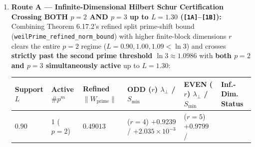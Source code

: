 \documentclass[
  11pt,
]{article}
\newcounter{none} %
\begin{document}
\begin{enumerate}
\def\labelenumi{\arabic{enumi}.}
\item
  \textbf{Route A --- Infinite-Dimensional Hilbert Schur Certification
  Crossing BOTH \(p = 2\) AND \(p = 3\) up to \(L = 1.30\)
  (\texttt{{[}1A{]}}--\texttt{{[}1B{]}}):} Combining Theorem 6.17.2's
  refined split prime-shift bound
  (\texttt{weilPrime\_refined\_norm\_bound}) with higher finite-block
  dimensions \(r\) clears the entire \(p = 2\) regime
  (\(L = 0.90, 1.00, 1.09 < \ln 3\)) and crosses \textbf{strictly past
  the second prime threshold \(\ln 3 \approx 1.0986\)} with \textbf{both
  \(p = 2\) and \(p = 3\) simultaneously active} up to \(L = 1.30\):

  {\def\LTcaptype{none} %
  \begin{longtable}[]{@{}
    >{\centering\arraybackslash}p{}
    >{\centering\arraybackslash}p{}
    >{\centering\arraybackslash}p{}
    >{\centering\arraybackslash}p{}
    >{\centering\arraybackslash}p{}
    >{\raggedright\arraybackslash}p{}@{}}
  \toprule\noalign{}
  \begin{minipage}[b]{\linewidth}\centering
  Support \(L\)
  \end{minipage} & \begin{minipage}[b]{\linewidth}\centering
  Active \(\#p^m\)
  \end{minipage} & \begin{minipage}[b]{\linewidth}\centering
  Refined \(\|W_{\text{prime}}\|\)
  \end{minipage} & \begin{minipage}[b]{\linewidth}\centering
  ODD (\(r\)) \(\lambda_\perp\) / \(S_{\min}\)
  \end{minipage} & \begin{minipage}[b]{\linewidth}\centering
  EVEN (\(r\)) \(\lambda_\perp\) / \(S_{\min}\)
  \end{minipage} & \begin{minipage}[b]{\linewidth}\raggedright
  Inf.-Dim. Status
  \end{minipage} \\
  \midrule\noalign{}
  \endhead
  \bottomrule\noalign{}
  \endlastfoot
  \(0.90\) & \(1\) (\(p=2\)) & \(0.49013\) & (\(r=4\)) \(+0.9239\) /
  \(+2.035\times 10^{-3}\) & (\(r=5\)) \(+0.9799\) /

\end{longtable}}
\end{enumerate}
\end{document}
